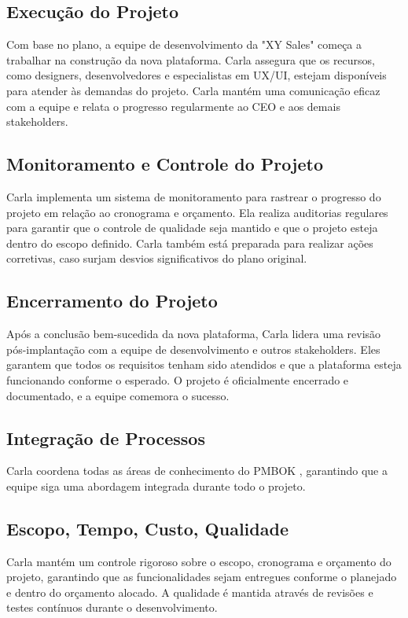 \documentclass[
	12pt,				%
	openright,			%
	twoside,			%
	a4paper,			%
	english,			%
	brazil				%
	]{abntex2}
\begin{document}
\subsection{Execução do Projeto}
Com base no plano, a equipe de desenvolvimento da "XY Sales" começa a trabalhar na construção da nova plataforma. Carla assegura que os recursos, como designers, desenvolvedores e especialistas em UX/UI, estejam disponíveis para atender às demandas do projeto. Carla mantém uma comunicação eficaz com a equipe e relata o progresso regularmente ao CEO e aos demais stakeholders.

\subsection{Monitoramento e Controle do Projeto}
Carla implementa um sistema de monitoramento para rastrear o progresso do projeto em relação ao cronograma e orçamento. Ela realiza auditorias regulares para garantir que o controle de qualidade seja mantido e que o projeto esteja dentro do escopo definido. Carla também está preparada para realizar ações corretivas, caso surjam desvios significativos do plano original.

\subsection{Encerramento do Projeto}
Após a conclusão bem-sucedida da nova plataforma, Carla lidera uma revisão pós-implantação com a equipe de desenvolvimento e outros stakeholders. Eles garantem que todos os requisitos tenham sido atendidos e que a plataforma esteja funcionando conforme o esperado. O projeto é oficialmente encerrado e documentado, e a equipe comemora o sucesso.

\subsection{Integração de Processos}
Carla coordena todas as áreas de conhecimento do PMBOK , garantindo que a equipe siga uma abordagem integrada durante todo o projeto.

\subsection{Escopo, Tempo, Custo, Qualidade}
Carla mantém um controle rigoroso sobre o escopo, cronograma e orçamento do projeto, garantindo que as funcionalidades sejam entregues conforme o planejado e dentro do orçamento alocado. A qualidade é mantida através de revisões e testes contínuos durante o desenvolvimento.
\end{document}
